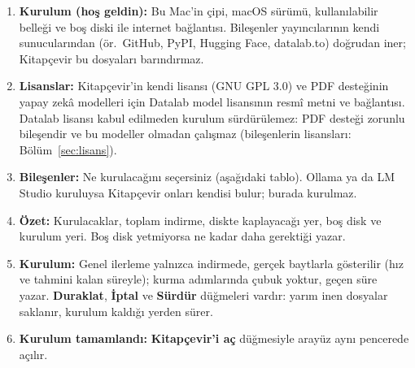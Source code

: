 \documentclass[11pt,a4paper]{article}
\newcommand{\dugme}[1]{\textsf{\bfseries #1}}
\begin{document}
\begin{enumerate}
  \item \textbf{Kurulum (hoş geldin):} Bu Mac'in çipi, macOS sürümü,
        kullanılabilir belleği ve boş diski ile internet bağlantısı.
        Bileşenler yayıncılarının kendi sunucularından (ör.\ GitHub, PyPI,
        Hugging Face, datalab.to) doğrudan iner; Kitapçevir bu dosyaları
        barındırmaz.
  \item \textbf{Lisanslar:} Kitapçevir'in kendi lisansı (GNU GPL 3.0) ve PDF
        desteğinin yapay zekâ modelleri için Datalab model lisansının resmî
        metni ve bağlantısı. Datalab lisansı kabul edilmeden kurulum
        sürdürülemez: PDF desteği zorunlu bileşendir ve bu modeller olmadan
        çalışmaz (bileşenlerin lisansları: Bölüm~\ref{sec:lisans}).
  \item \textbf{Bileşenler:} Ne kurulacağını seçersiniz (aşağıdaki tablo).
        Ollama ya da LM Studio kuruluysa Kitapçevir onları kendisi bulur;
        burada kurulmaz.
  \item \textbf{Özet:} Kurulacaklar, toplam indirme, diskte kaplayacağı yer,
        boş disk ve kurulum yeri. Boş disk yetmiyorsa ne kadar daha gerektiği
        yazar.
  \item \textbf{Kurulum:} Genel ilerleme yalnızca indirmede, gerçek baytlarla
        gösterilir (hız ve tahmini kalan süreyle); kurma adımlarında çubuk
        yoktur, geçen süre yazar. \dugme{Duraklat}, \dugme{İptal} ve
        \dugme{Sürdür} düğmeleri vardır: yarım inen dosyalar saklanır, kurulum
        kaldığı yerden sürer.
  \item \textbf{Kurulum tamamlandı:} \dugme{Kitapçevir'i aç} düğmesiyle
        arayüz aynı pencerede açılır.
\end{enumerate}
\end{document}
